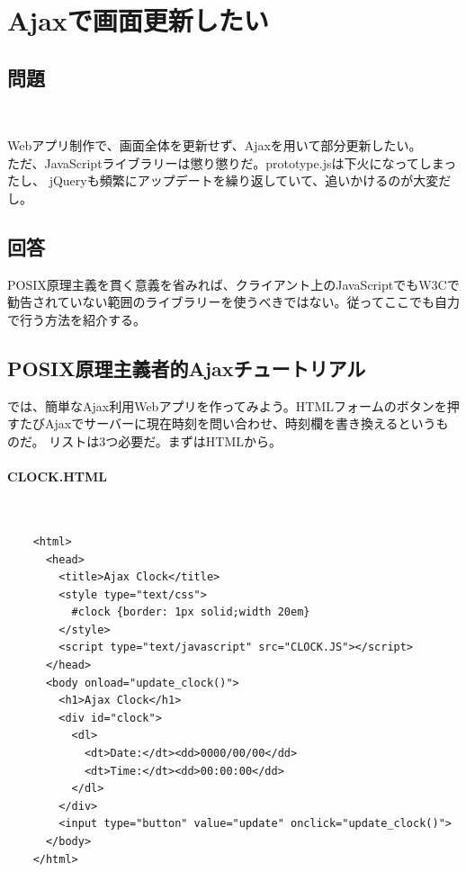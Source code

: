 \section{Ajaxで画面更新したい}
\label{recipe:Ajax_without_libraries}

\subsection*{問題}
\noindent
$\!\!\!\!\!$
\begin{grshfboxit}{160.0mm}
	Webアプリ制作で、画面全体を更新せず、Ajaxを用いて部分更新したい。\\
	ただ、JavaScriptライブラリーは懲り懲りだ。prototype.jsは下火になってしまったし、
	jQueryも頻繁にアップデートを繰り返していて、追いかけるのが大変だし。
\end{grshfboxit}

\subsection*{回答}
POSIX原理主義を貫く意義を省みれば、クライアント上のJavaScriptでもW3Cで勧告されていない範囲のライブラリーを使うべきではない。従ってここでも自力で行う方法を紹介する。

\subsection*{POSIX原理主義者的Ajaxチュートリアル}

では、簡単なAjax利用Webアプリを作ってみよう。HTMLフォームのボタンを押すたびAjaxでサーバーに現在時刻を問い合わせ、時刻欄を書き換えるというものだ。
リストは3つ必要だ。まずはHTMLから。
\paragraph{CLOCK.HTML} 　\\
\begin{frameboxit}{160.0mm}
\begin{verbatim}
	<html>
	  <head>
	    <title>Ajax Clock</title>
	    <style type="text/css">
	      #clock {border: 1px solid;width 20em}
	    </style>
	    <script type="text/javascript" src="CLOCK.JS"></script>
	  </head>
	  <body onload="update_clock()">
	    <h1>Ajax Clock</h1>
	    <div id="clock">
	      <dl>
	        <dt>Date:</dt><dd>0000/00/00</dd>
	        <dt>Time:</dt><dd>00:00:00</dd>
	      </dl>
	    </div>
	    <input type="button" value="update" onclick="update_clock()">
	  </body>
	</html>
\end{verbatim}
\end{frameboxit}

